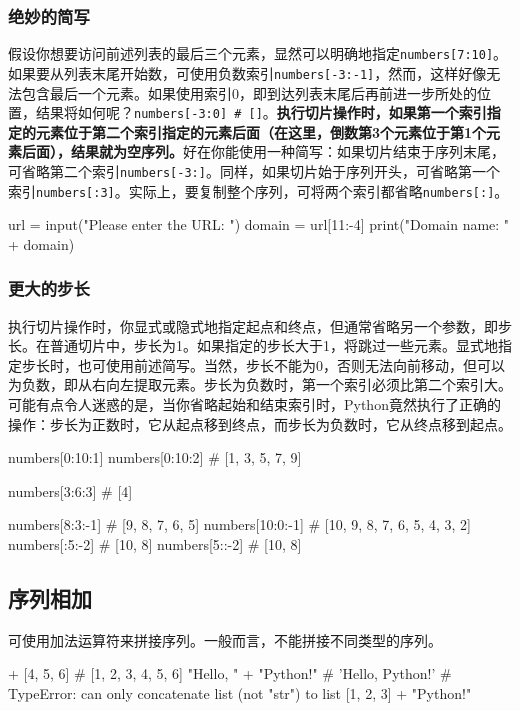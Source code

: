 \subsubsection{绝妙的简写}
假设你想要访问前述列表的最后三个元素，显然可以明确地指定\verb|numbers[7:10]|。如果要从列表末尾开始数，可使用负数索引\verb|numbers[-3:-1]|，然而，这样好像无法包含最后一个元素。如果使用索引0，即到达列表末尾后再前进一步所处的位置，结果将如何呢？\verb|numbers[-3:0] # []|。\textbf{执行切片操作时，如果第一个索引指定的元素位于第二个索引指定的元素后面（在这里，倒数第3个元素位于第1个元素后面），结果就为空序列。}好在你能使用一种简写：如果切片结束于序列末尾，可省略第二个索引\verb|numbers[-3:]|。同样，如果切片始于序列开头，可省略第一个索引\verb|numbers[:3]|。实际上，要复制整个序列，可将两个索引都省略\verb|numbers[:]|。

\begin{pyc}
url = input("Please enter the URL: ")
domain = url[11:-4]
print("Domain name: " + domain)
\end{pyc}

\subsubsection{更大的步长}
执行切片操作时，你显式或隐式地指定起点和终点，但通常省略另一个参数，即步长。在普通切片中，步长为1。如果指定的步长大于1，将跳过一些元素。显式地指定步长时，也可使用前述简写。当然，步长不能为0，否则无法向前移动，但可以为负数，即从右向左提取元素。步长为负数时，第一个索引必须比第二个索引大。可能有点令人迷惑的是，当你省略起始和结束索引时，Python竟然执行了正确的操作：步长为正数时，它从起点移到终点，而步长为负数时，它从终点移到起点。

\begin{pyc}
numbers[0:10:1]
numbers[0:10:2]  # [1, 3, 5, 7, 9]

numbers[3:6:3]  # [4]

numbers[8:3:-1]  # [9, 8, 7, 6, 5]
numbers[10:0:-1]  # [10, 9, 8, 7, 6, 5, 4, 3, 2]
numbers[:5:-2]  # [10, 8]
numbers[5::-2]  # [10, 8]
\end{pyc}

\subsection{序列相加}
可使用加法运算符来拼接序列。一般而言，不能拼接不同类型的序列。
\begin{pyc}
[1, 2, 3] + [4, 5, 6]  # [1, 2, 3, 4, 5, 6]
"Hello, " + "Python!"  # 'Hello, Python!'
# TypeError: can only concatenate list (not "str") to list
[1, 2, 3] + "Python!"
\end{pyc}


